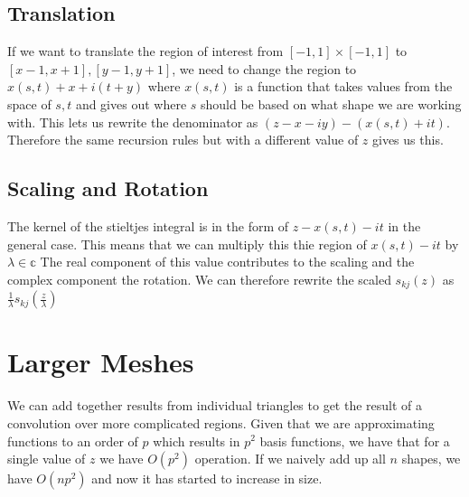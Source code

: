 \documentclass{article}
\begin{document}
\subsection{Translation}
If we want to translate the region of interest from $[-1,1]\times[-1,1]$ to $[x-1,x+1],[y-1,y+1]$, we need to change the region to $x(s,t)+x+i(t+y)$ where $x(s,t)$ is a function that takes values from the space of $s,t$ and gives out where $s$ should be based on what shape we are working with.
This lets us rewrite the denominator as $(z-x-iy)-(x(s,t)+it)$.
Therefore the same recursion rules but with a different value of $z$ gives us this.

\subsection{Scaling and Rotation}
The kernel of the stieltjes integral is in the form of $z-x(s,t)-it$ in the general case.
This means that we can multiply this thie region of $x(s,t)-it$ by $\lambda\in\mathbb{c}$
The real component of this value contributes to the scaling and the complex component the rotation.
We can therefore rewrite the scaled $s_{kj}(z)$ as $\frac{1}{\lambda}s_{kj}(\frac{z}{\lambda})$
\section{Larger Meshes}
We can add together results from individual triangles to get the result of a convolution over more complicated regions.
Given that we are approximating functions to an order of $p$ which results in $p^2$ basis functions, we have that for a single value of $z$ we have $O(p^2)$ operation.
If we naively add up all $n$ shapes, we have $O(np^2)$ and now it has started to increase in size.
\end{document}
